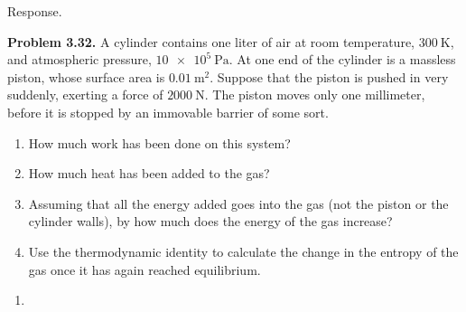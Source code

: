 \documentclass[a4paper, 12pt]{config/homework}
\begin{document}
\noindent
Response.


\bigskip
\noindent
\textbf{Problem 3.32.} A cylinder contains one liter of air at room temperature, \(\qty{300}{\kelvin}\), and atmospheric pressure, \(\qty{10e5}{\Pa}\). At one end of the cylinder is a massless piston, whose surface area is \(\qty{0.01}{\meter\squared}\). Suppose that the piston is pushed in very suddenly, exerting a force of \(\qty{2000}{\newton}\). The piston moves only one millimeter, before it is stopped by an immovable barrier of some sort.
\begin{enumerate}[label=\textbf{(\alph*)}]
\item How much work has been done on this system?
\item How much heat has been added to the gas?
\item Assuming that all the energy added goes into the gas (not the piston or the cylinder walls), by how much does the energy of the gas increase?
\item Use the thermodynamic identity to calculate the change in the entropy of the gas once it has again reached equilibrium.
\end{enumerate}
\begin{enumerate}[label=\textbf{(\alph*)}]
\item 
\end{enumerate}
\end{document}
